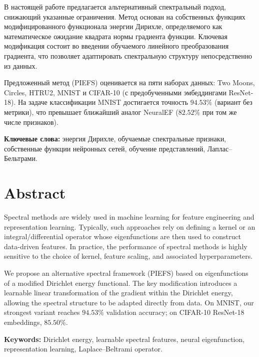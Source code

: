 \documentclass[14pt, a4paper, oneside]{extreport}
\theoremstyle{plain}
\theoremstyle{definition}
\begin{document}
В настоящей работе предлагается альтернативный спектральный подход, снижающий указанные ограничения.
Метод основан на собственных функциях модифицированного функционала энергии Дирихле, определяемого как математическое ожидание квадрата нормы градиента функции.
Ключевая модификация состоит во введении обучаемого линейного преобразования градиента, что позволяет адаптировать спектральную структуру непосредственно из данных.

Предложенный метод (PIEFS) оценивается на пяти наборах данных: Two Moons, Circles, HTRU2, MNIST и CIFAR-10 (с предобученными эмбеддингами ResNet-18).
На задаче классификации MNIST достигается точность \(94.53\%\) (вариант без метрики), что превышает ближайший аналог NeuralEF (\(82.52\%\) при том же числе признаков).

\textbf{Ключевые слова:} энергия Дирихле, обучаемые спектральные признаки, собственные функции нейронных сетей, обучение представлений, Лаплас--Бельтрами.

\chapter*{Abstract}

Spectral methods are widely used in machine learning for feature engineering and representation learning.
Typically, such approaches rely on defining a kernel or an integral/differential operator whose eigenfunctions are then used to construct data-driven features.
In practice, the performance of spectral methods is highly sensitive to the choice of kernel, feature scaling, and associated hyperparameters.

We propose an alternative spectral framework (PIEFS) based on eigenfunctions of a modified Dirichlet energy functional.
The key modification introduces a learnable linear transformation of the gradient within the Dirichlet energy, allowing the spectral structure to be adapted directly from data.
On MNIST, our strongest variant reaches $94.53\%$ validation accuracy; on CIFAR-10 ResNet-18 embeddings, $85.50\%$.

\textbf{Keywords:} Dirichlet energy, learnable spectral features, neural eigenfunction, representation learning, Laplace--Beltrami operator.

\tableofcontents

\end{document}
